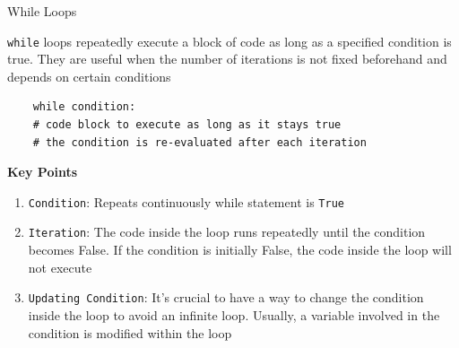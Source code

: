 \documentclass[
	11pt, 
]{beamer}
\begin{document}

\begin{frame}[fragile]{While Loops}

\texttt{while} loops repeatedly execute a block of code as long as a specified condition is true. They are useful when the number of iterations is not fixed beforehand and depends on certain conditions

\begin{verbatim}
    while condition:
    # code block to execute as long as it stays true
    # the condition is re-evaluated after each iteration
\end{verbatim}

\begin{block}{\textbf{Key Points}}
    \begin{enumerate}
        \item \texttt{Condition}: Repeats continuously while statement is \texttt{True}

        \item \texttt{Iteration}: The code inside the loop runs repeatedly until the condition becomes False. If the condition is initially False, the code inside the loop will not execute

        \item  \texttt{Updating Condition}: It's crucial to have a way to change the condition inside the loop to avoid an infinite loop. Usually, a variable involved in the condition is modified within the loop
    \end{enumerate}
\end{block}

\end{frame}

\end{document}
